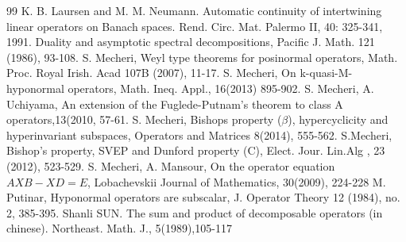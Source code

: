 \documentclass[12pt,a4paper]{amsart}
\begin{document}
\begin{thebibliography}{99}
 K. B. Laursen and M. M. Neumann.
Automatic continuity of intertwining linear operators on Banach
spaces. Rend. Circ. Mat. Palermo II, 40: 325-341, 1991.
  Duality and asymptotic spectral decompositions, Pacific J. Math.
121 (1986), 93-108.
 S. Mecheri, Weyl type theorems for posinormal operators, Math. Proc. Royal Irish. Acad 107B (2007), 11-17.
 S. Mecheri, On k-quasi-M-hyponormal operators, Math. Ineq. Appl., 16(2013) 895-902.
 S. Mecheri, A. Uchiyama, An extension of the Fuglede-Putnam’s theorem to class A operators,13(2010, 57-61.
 S. Mecheri, Bishops property ($\beta$),
hypercyclicity and hyperinvariant subspaces, Operators and
Matrices 8(2014), 555-562.
 S.Mecheri, Bishop's
property, SVEP and Dunford property (C), Elect. Jour. Lin.Alg , 23
(2012), 523-529.
 S. Mecheri, A. Mansour, On the operator equation $AXB-XD= E$, Lobachevskii Journal of Mathematics, 30(2009), 224-228
 M. Putinar, Hyponormal operators are
subscalar, J. Operator Theory 12 (1984), no. 2, 385-395.
 Shanli SUN. The sum and product of decomposable operators (in
chinese). Northeast. Math. J., 5(1989),105-117

\end{thebibliography}{}
\end{document}
